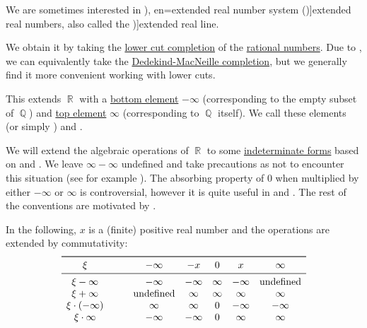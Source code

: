 \begin{definition}\label{def:extended_real_numbers}\mimprovised
  We are sometimes interested in \term[ru=расширенная вещественная прямая (\cite[23]{ИоффеТихомиров1974ЭкстремальныеЗадачи}), en=extended real number system (\cite[10]{Folland1999RealAnalysis})]{extended real numbers}, also called the \term[en=extended real line (\cite[\S 1.4]{Rudin1987RealAndComplexAnalysis})]{extended real line}.

  We obtain it by taking the \hyperref[def:lower_cut_completion]{ lower cut completion} of the \hyperref[def:rational_numbers]{rational numbers}. Due to , we can equivalently take the \hyperref[def:dedekind_macnielle_completion]{Dedekind-MacNeille completion}, but we generally find it more convenient working with lower cuts.

  This extends \( \BbbR \) with a \hyperref[def:extremal_points/top_and_bottom]{bottom element} \( -\infty \) (corresponding to the empty subset of \( \BbbQ \)) and \hyperref[def:extremal_points/top_and_bottom]{top element} \( \infty \) (corresponding to \( \BbbQ \) itself). We call these elements  (or simply ) and .

  We will extend the algebraic operations of \( \BbbR \) to some \hyperref[def:indeterminate_form]{indeterminate forms} based on \cite[\S 1.1.17]{Schechter1997AnalysisHandbook} and \cite[11]{Folland1999RealAnalysis}. We leave \( \infty - \infty \) undefined and take precautions as not to encounter this situation (see for example ). The absorbing property of \( 0 \) when multiplied by either \( -\infty \) or \( \infty \) is controversial, however it is quite useful in  and . The rest of the conventions are motivated by .

  In the following, \( x \) is a (finite) positive real number and the operations are extended by commutativity:
  \begin{equation*}
    \begin{array}{c !{\qquad} *{5}{c}}
      \toprule
      \xi                 & -\infty       & -x      & 0      & x       & \infty        \\
      \midrule
      \xi - \infty        & -\infty       & -\infty & \infty & -\infty & \T{undefined} \\
      \xi + \infty        & \T{undefined} & \infty  & \infty & \infty  & \infty \\
      \xi \cdot (-\infty) & \infty        & \infty  & 0      & -\infty & -\infty \\
      \xi \cdot \infty    & -\infty       & -\infty & 0      & \infty  & \infty \\
    \end{array}
  \end{equation*}
\end{definition}

